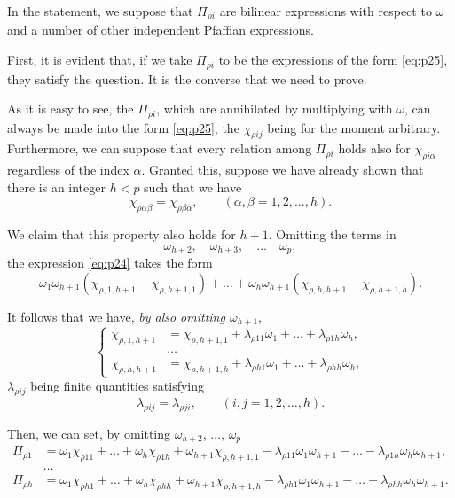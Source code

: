 \documentclass[leqno,11pt]{book}
\theoremstyle{shape1}
\theoremstyle{shapesmall}
\begin{document}
In the statement, we suppose that $\Pi_{\rho i}$ are bilinear expressions with respect to $\omega$ and a number of other independent Pfaffian expressions.

First, it is evident that, if we take $\Pi_{\rho i}$ to be the expressions of the form \eqref{eq:p25}, they satisfy the question. It is the converse that we need to prove.

As it is easy to see, the $\Pi_{\rho i}$, which are annihilated by multiplying with $\omega$, can always be made into the form \eqref{eq:p25}, the $\chi_{\rho ij}$ being for the moment arbitrary. Furthermore, we can suppose that every relation among $\Pi_{\rho i}$ holds also for $\chi_{\rho i\alpha}$ regardless of the index $\alpha$. Granted this, suppose we have already shown that there is an integer $h<p$ such that we have
\[
\chi_{\rho \alpha\beta}=\chi_{\rho\beta\alpha},\qquad(\alpha,\beta=1,2,\dots,h).
\]

We claim that this property also holds for $h+1$.  Omitting the terms in
\[
\omega_{h+2},\quad\omega_{h+3},\quad\dots\quad\omega_{p},
\]
the expression \eqref{eq:p24} takes the form
\[
\omega_{1}\omega_{h+1}(\chi_{\rho,1,h+1}-\chi_{\rho,h+1,1})+\dots+\omega_{h}\omega_{h+1}(\chi_{\rho,h,h+1}-\chi_{\rho,h+1,h}).
\]

It follows that we have, \emph{by also omitting $\omega_{h+1}$},
\begin{equation}
  \label{eq:p26}
  \left\{
    \begin{aligned}
      \chi_{\rho,1,h+1}&=\chi_{\rho,h+1,1}+\lambda_{\rho11}\omega_{1}+\dots+\lambda_{\rho 1 h}\omega_{h},\\
      &\dots\\
      \chi_{\rho,h,h+1}&=\chi_{\rho,h+1,h}+\lambda_{\rho h1}\omega_{1}+\dots+\lambda_{\rho h h}\omega_{h},
    \end{aligned}
  \right.
\end{equation}
$\lambda_{\rho ij}$ being finite quantities satisfying
\[
\lambda_{\rho ij}=\lambda_{\rho ji},\qquad(i,j=1,2,\dots,h).
\]

Then, we can set, by omitting $\omega_{h+2}$, $\dots$, $\omega_{p}$
\begin{align*}
  \Pi_{\rho 1}&=\omega_{1}\chi_{\rho 11}+\dots+\omega_{h}\chi_{\rho 1 h}+\omega_{h+1}\chi_{\rho,h+1,1}-\lambda_{\rho 11}\omega_{1}\omega_{h+1}-\dots-\lambda_{\rho 1 h}\omega_{h}\omega_{h+1},\\
  &\dots\\
  \Pi_{\rho h}&=\omega_{1}\chi_{\rho h1}+\dots+\omega_{h}\chi_{\rho h h}+\omega_{h+1}\chi_{\rho,h+1,h}-\lambda_{\rho h1}\omega_{1}\omega_{h+1}-\dots-\lambda_{\rho h h}\omega_{h}\omega_{h+1}.
\end{align*}
\end{document}
